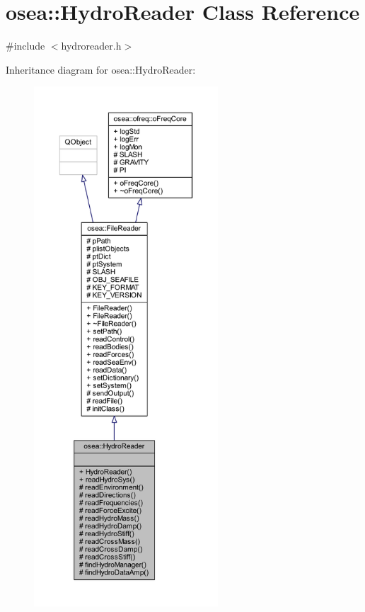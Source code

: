 \hypertarget{classosea_1_1_hydro_reader}{\section{osea\-:\-:Hydro\-Reader Class Reference}
\label{classosea_1_1_hydro_reader}
}


{\ttfamily \#include $<$hydroreader.\-h$>$}



Inheritance diagram for osea\-:\-:Hydro\-Reader\-:
\nopagebreak
\begin{figure}[H]
\begin{center}
\leavevmode
\includegraphics[height=550pt]{classosea_1_1_hydro_reader__inherit__graph}
\end{center}
\end{figure}
